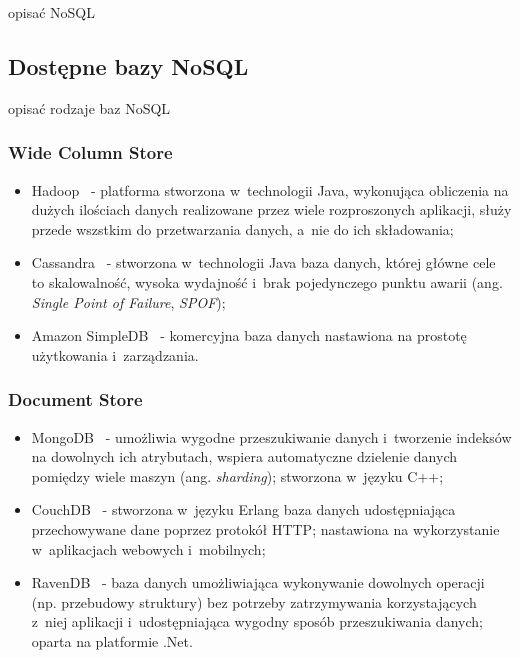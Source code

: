 opisać NoSQL

\subsection{Dostępne bazy NoSQL}

opisać rodzaje baz NoSQL

\subsubsection{Wide Column Store}

\begin{itemize}
 \item Hadoop~\cite{hadoop} - platforma stworzona w~technologii Java, wykonująca obliczenia na dużych ilościach danych realizowane przez wiele rozproszonych aplikacji, służy przede wszstkim do przetwarzania danych, a~nie do ich składowania;
 \item Cassandra~\cite{cassandra} - stworzona w~technologii Java baza danych, której główne cele to skalowalność, wysoka wydajność i~brak pojedynczego punktu awarii (ang. \emph{Single Point of Failure}, \emph{SPOF});
 \item Amazon SimpleDB~\cite{simple_db} - komercyjna baza danych nastawiona na prostotę użytkowania i~zarządzania.
\end{itemize}

\subsubsection{Document Store}

\begin{itemize}
 \item MongoDB~\cite{mongo_db} - umożliwia wygodne przeszukiwanie danych i~tworzenie indeksów na dowolnych ich atrybutach, wspiera automatyczne dzielenie danych pomiędzy wiele maszyn (ang. \emph{sharding}); stworzona w~języku C++;
 \item CouchDB~\cite{couch_db} - stworzona w~języku Erlang baza danych udostępniająca przechowywane dane poprzez protokół HTTP; nastawiona na wykorzystanie w~aplikacjach webowych i~mobilnych;
 \item RavenDB~\cite{raven_db} - baza danych umożliwiająca wykonywanie dowolnych operacji (np. przebudowy struktury) bez potrzeby zatrzymywania korzystających z~niej aplikacji i~udostępniająca wygodny sposób przeszukiwania danych; oparta na platformie .Net.
\end{itemize}

